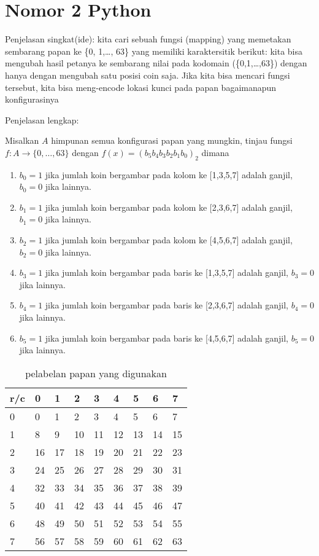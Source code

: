 \documentclass[12pt,letterpaper]{article}
\begin{document}
\break

\section{Nomor 2 Python}
 Penjelasan singkat(ide): kita cari sebuah fungsi (mapping) yang memetakan sembarang papan ke \{0, 1,\dots, 63\}
 yang memiliki karaktersitik berikut: kita bisa mengubah hasil petanya ke sembarang nilai pada kodomain (\{0,1,\dots,63\}) dengan hanya dengan mengubah satu posisi coin saja.
 Jika kita bisa mencari fungsi tersebut, kita bisa meng-encode lokasi kunci pada papan bagaimanapun konfigurasinya 

 \vline

Penjelasan lengkap:

Misalkan $A$ himpunan semua konfigurasi papan yang mungkin, tinjau fungsi $f :A \rightarrow\{0,\dots,63\}$
 dengan $f(x)=  (b_ 5 b_4 b_3 b_2 b_1 b_0)_2 $ dimana
 \begin{enumerate}
    \item $ b_0=1$ jika jumlah koin bergambar pada kolom ke [1,3,5,7] adalah ganjil, $b_0=0$ jika lainnya. 
    \item $ b_1=1$ jika jumlah koin bergambar pada kolom ke [2,3,6,7] adalah ganjil, $b_1=0$ jika lainnya. 
    \item $ b_2=1$ jika jumlah koin bergambar pada kolom ke [4,5,6,7] adalah ganjil, $b_2=0$ jika lainnya. 
    \item $ b_3=1$ jika jumlah koin bergambar pada baris ke [1,3,5,7] adalah ganjil, $b_3=0$ jika lainnya. 
    \item $ b_4=1$ jika jumlah koin bergambar pada baris ke [2,3,6,7] adalah ganjil, $b_4=0$ jika lainnya. 
    \item $ b_5=1$ jika jumlah koin bergambar pada baris ke [4,5,6,7] adalah ganjil, $b_5=0$ jika lainnya. 
\end{enumerate}
\begin{table}[H]
    \centering
    \caption{pelabelan papan yang digunakan}
    \begin{tabular}{|l||l|l|l|l|l|l|l|l|}
    \hline
        r/c & 0 & 1 & 2 & 3 & 4 & 5 & 6 & 7 \\ \hline\hline
        0 & 0 & 1 & 2 & 3 & 4 & 5 & 6 & 7 \\ \hline
        1 & 8 & 9 & 10 & 11 & 12 & 13 & 14 & 15 \\ \hline
        2 & 16 & 17 & 18 & 19 & 20 & 21 & 22 & 23 \\ \hline
        3 & 24 & 25 & 26 & 27 & 28 & 29 & 30 & 31 \\ \hline
        4 & 32 & 33 & 34 & 35 & 36 & 37 & 38 & 39 \\ \hline
        5 & 40 & 41 & 42 & 43 & 44 & 45 & 46 & 47 \\ \hline
        6 & 48 & 49 & 50 & 51 & 52 & 53 & 54 & 55 \\ \hline
        7 & 56 & 57 & 58 & 59 & 60 & 61 & 62 & 63 \\ \hline
    \end{tabular}
    \label{papan}
\end{table}
\end{document}

